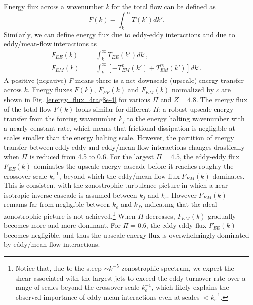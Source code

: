 \documentclass{jfm}
\begin{document}
Energy flux across a wavenumber $k$ for the total flow can be defined
as
\begin{equation}
F(k)=\int_{k}^{\infty}T(k')dk'.\label{eq:energy_flux}
\end{equation}
Similarly, we can define energy flux due to eddy-eddy interactions
and due to eddy/mean-flow interactions as
\begin{eqnarray}
F_{EE}(k) & = & \int_{k}^{\infty}T_{EE}(k')dk',\label{eq:energy_flux_EE}\\
F_{EM}(k) & = & \int_{k}^{\infty}\left[-T_{EM}^{e}(k')+T_{EM}^{m}(k')\right]dk'.\label{eq:energy_flux_EM}
\end{eqnarray}
A positive (negative) $F$ means there is a net downscale (upscale)
energy transfer across $k$. Energy fluxes $F(k)$, $F_{EE}(k)$ and
$F_{EM}(k)$ normalized by $\varepsilon$ are shown in Fig. \ref{energy_flux_drag8e-4}
for various $\Pi$ and $Z=4.8$. The energy flux of the total flow $F(k)$ looks
similar for different $\Pi$: a robust upscale energy transfer from
the forcing wavenumber $k_{f}$ to the energy halting wavenumber with
a nearly constant rate, which means that frictional dissipation is
negligible at scales smaller than the energy halting scale. However,
the partition of energy transfer between eddy-eddy and eddy/mean-flow
interactions changes drastically when $\Pi$ is reduced from 4.5 to 0.6.
For the largest $\Pi=4.5$, the eddy-eddy flux $F_{EE}(k)$ dominates
the upscale energy cascade before it reaches roughly
the crossover scale $k_{\varepsilon}^{-1}$, beyond which the eddy/mean-flow
flux $F_{EM}(k)$ dominates. This is consistent with the zonostrophic turbulence
picture in which a near-isotropic inverse cascade is assumed between
$k_{f}$ and $k_{\varepsilon}$. However $F_{EM}(k)$ remains far from negligible between
$k_{\varepsilon}$ and $k_{f}$, indicating that the ideal zonostrophic picture is 
not achieved.\footnote{Notice that, due to the steep $\sim k^{-5}$ zonostrophic spectrum,
we expect the shear associated with the largest jets to exceed the eddy turnover rate over a range of scales
beyond the crossover scale $k_{\varepsilon}^{-1}$, which likely explains the observed importance of
eddy-mean interactions even at scales $<k_{\varepsilon}^{-1}$.}
When $\Pi$ decreases, $F_{EM}(k)$ gradually becomes more 
and more dominant. For $\Pi=0.6$, the eddy-eddy
flux $F_{EE}(k)$ becomes negligible, and thus the upscale energy
flux is overwhelmingly dominated by eddy/mean-flow interactions.
\end{document}
